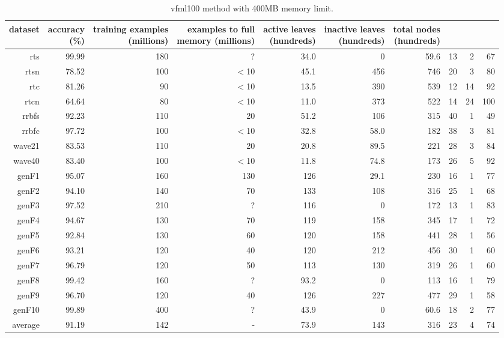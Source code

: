 \clearpage
\begin{table}
\caption{{\sc vfml100} method with 400MB memory limit.}
\label{tab:vfml100-400MB}
\centering
\begin{tabular}{|r|r|r|r|r|r|r|r|r|r|}
\hline
dataset	&
\rotatebox{90}{\parbox{9em}{accuracy\\(\%)}} &
\rotatebox{90}{\parbox{9em}{training examples\\(millions)}} &
\rotatebox{90}{\parbox{9em}{examples to full\\memory (millions)}} &
\rotatebox{90}{\parbox{9em}{active leaves\\(hundreds)}} &
\rotatebox{90}{\parbox{9em}{inactive leaves\\(hundreds)}} &
\rotatebox{90}{\parbox{9em}{total nodes\\(hundreds)}} &
\rotatebox{90}{\parbox{9em}{tree depth}}	&
\rotatebox{90}{\parbox{9em}{training speed (\%)}} &
\rotatebox{90}{\parbox{9em}{prediction speed (\%)}} \\
\hline
{\sc rts} & 99.99 & 180 & ? & 34.0 & 0 & 59.6 & 13 & 2 & 67 \\
{\sc rtsn} & 78.52 & 100 & $<$10 & 45.1 & 456 & 746 & 20 & 3 & 80 \\
{\sc rtc} & 81.26 & 90 & $<$10 & 13.5 & 390 & 539 & 12 & 14 & 92 \\
{\sc rtcn} & 64.64 & 80 & $<$10 & 11.0 & 373 & 522 & 14 & 24 & 100 \\
{\sc rrbfs} & 92.23 & 110 & 20 & 51.2 & 106 & 315 & 40 & 1 & 49 \\
{\sc rrbfc} & 97.72 & 100 & $<$10 & 32.8 & 58.0 & 182 & 38 & 3 & 81 \\
{\sc wave21} & 83.53 & 110 & 20 & 20.8 & 89.5 & 221 & 28 & 3 & 84 \\
{\sc wave40} & 83.40 & 100 & $<$10 & 11.8 & 74.8 & 173 & 26 & 5 & 92 \\
{\sc genF1} & 95.07 & 160 & 130 & 126 & 29.1 & 230 & 16 & 1 & 77 \\
{\sc genF2} & 94.10 & 140 & 70 & 133 & 108 & 316 & 25 & 1 & 68 \\
{\sc genF3} & 97.52 & 210 & ? & 116 & 0 & 172 & 13 & 1 & 83 \\
{\sc genF4} & 94.67 & 130 & 70 & 119 & 158 & 345 & 17 & 1 & 72 \\
{\sc genF5} & 92.84 & 130 & 60 & 120 & 158 & 441 & 28 & 1 & 56 \\
{\sc genF6} & 93.21 & 120 & 40 & 120 & 212 & 456 & 30 & 1 & 60 \\
{\sc genF7} & 96.79 & 120 & 50 & 113 & 130 & 319 & 26 & 1 & 60 \\
{\sc genF8} & 99.42 & 160 & ? & 93.2 & 0 & 113 & 16 & 1 & 79 \\
{\sc genF9} & 96.70 & 120 & 40 & 126 & 227 & 477 & 29 & 1 & 58 \\
{\sc genF10} & 99.89 & 400 & ? & 43.9 & 0 & 60.6 & 18 & 2 & 77 \\
\hline
average & 91.19 & 142 &  -  & 73.9 & 143 & 316 & 23 & 4 & 74 \\
\hline
\end{tabular}
\end{table}
